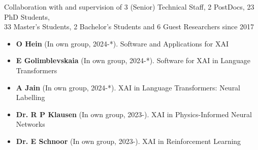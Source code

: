 
\newcommand{\supervision}[3]{\textbf{#1} (In own group, #2). {\small #3}}
\newcommand{\cosupervision}[4]{\textbf{#1} (#2, #3, co-supervision). {\small #4}}

\ifdefined\shortcv
    {
        \hspace*{\fill} Collaboration with and supervision of 3 (Senior) Technical Staff, 2 PostDocs, 23 PhD Students,\\
        \hspace*{\fill} 33 Master's Students, 2 Bachelor's Students and 6 Guest Researchers since 2017
        }
\else

        {
            \begin{itemize}
                \item [] \supervision{O Hein}{2024-*}{Software and Applications for XAI}
            \end{itemize}
        }

        {
            \begin{itemize}
                \item [] \supervision{E Golimblevskaia}{2024-*}{Software for XAI in Language Transformers}
                \item [] \supervision{A Jain}{2024-*}{XAI in Language Transformers: Neural Labelling}
            \end{itemize}
        }

        {
            \begin{itemize}
                \item [] \supervision{Dr. R P Klausen}{2023-}{XAI in Physics-Informed Neural Networks}
                \item [] \supervision{Dr. E Schnoor}{2023-}{XAI in Reinforcement Learning}
            \end{itemize}
        }

